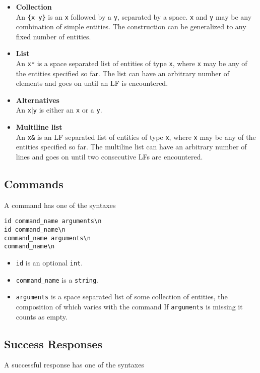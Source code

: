 \documentclass[a4paper]{article}
\begin{document}
\begin{itemize}
\item \textbf{Collection} \\
  An \texttt{\{x y\}} is an \texttt{x} followed by a \texttt{y},
  separated by a space. \texttt{x} and \texttt{y} may be any
  combination of simple entities. The construction can be generalized
  to any fixed number of entities.

\item \textbf{List} \\
  An \texttt{x*} is a space separated list of entities of type
  \texttt{x}, where \texttt{x} may be any of the entities specified so
  far. The list can have an arbitrary number of elements and goes on
  until an LF is encountered.

\item \textbf{Alternatives} \\
An \texttt{x$|$y} is either an \texttt{x} or a \texttt{y}.

\item \textbf{Multiline list} \\
  An \texttt{x\&} is an LF separated list of entities of type
  \texttt{x}, where \texttt{x} may be any of the entities specified so
  far. The multiline list can have an arbitrary number of lines and
  goes on until two consecutive LFs are encountered.
\end{itemize}

\subsection{Commands}
A command has one of the syntaxes

\begin{verbatim}
id command_name arguments\n
id command_name\n
command_name arguments\n
command_name\n
\end{verbatim}

\begin{itemize}
\item \texttt{id} is an optional \texttt{int}.
\item \texttt{command\_name} is a \texttt{string}.
\item \texttt{arguments} is a space separated list of some collection
  of entities, the composition of which varies with the command If
  \texttt{arguments} is missing it counts as empty.
\end{itemize}

\subsection{Success Responses}
A successful response has one of the syntaxes
\end{document}
